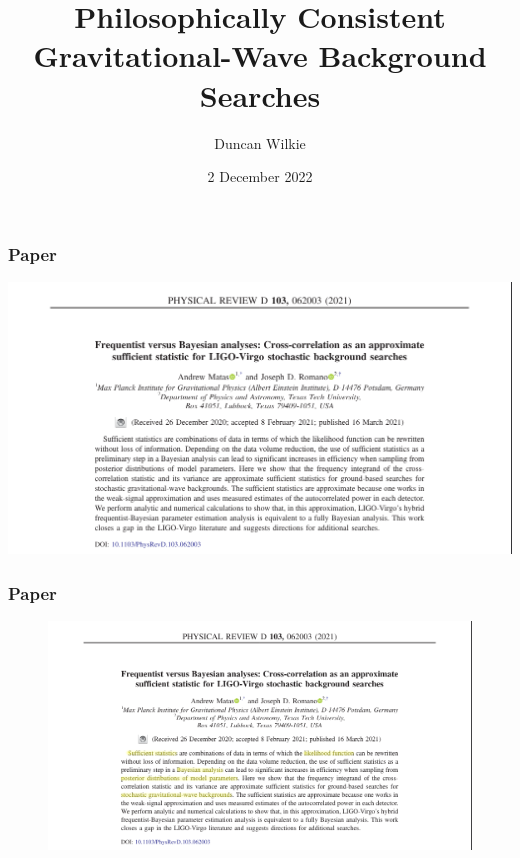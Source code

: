 \documentclass[10pt]{beamer}
\title{Philosophically Consistent Gravitational-Wave Background Searches}
\author{Duncan Wilkie}
\date{2 December 2022}
\begin{document}
\begin{frame}
  \titlepage
\end{frame}

\begin{frame}
  \frametitle{Paper}
  \begin{center}
    \includegraphics[scale=0.3]{abstract.png}
  \end{center}
\end{frame}

\begin{frame}
  \frametitle{Paper}
  \begin{figure}
    \centering
    \includegraphics[scale=0.3]{abstract_interesting.png}
  \end{figure}
\end{frame}
\end{document}
